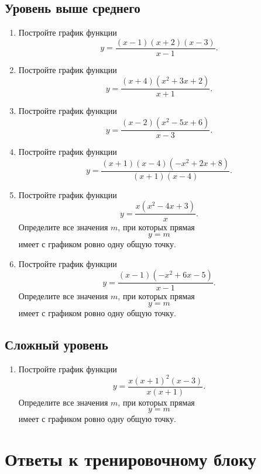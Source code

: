 \documentclass[a4paper,12pt]{article}
\begin{document}
\subsection*{Уровень выше среднего}

\begin{enumerate}[label=\textbf{\arabic*.},start=4]
  \item Постройте график функции
  \[
    y=
    \frac{(x-1)(x+2)(x-3)}{x-1}.
  \]

  \item Постройте график функции
  \[
    y=
    \frac{(x+4)(x^2+3x+2)}{x+1}.
  \]

  \item Постройте график функции
  \[
    y=
    \frac{(x-2)(x^2-5x+6)}{x-3}.
  \]

  \item Постройте график функции
  \[
    y=
    \frac{(x+1)(x-4)(-x^2+2x+8)}
         {(x+1)(x-4)}.
  \]

  \item Постройте график функции
  \[
    y=
    \frac{x(x^2-4x+3)}{x}.
  \]
  Определите все значения \(m\), при которых прямая
  \[
    y=m
  \]
  имеет с графиком ровно одну общую точку.

  \item Постройте график функции
  \[
    y=
    \frac{(x-1)(-x^2+6x-5)}{x-1}.
  \]
  Определите все значения \(m\), при которых прямая
  \[
    y=m
  \]
  имеет с графиком ровно одну общую точку.
\end{enumerate}

\subsection*{Сложный уровень}

\begin{enumerate}[label=\textbf{\arabic*.},start=10]
  \item Постройте график функции
  \[
    y=
    \frac{x(x+1)^2(x-3)}
         {x(x+1)}.
  \]
  Определите все значения \(m\), при которых прямая
  \[
    y=m
  \]
  имеет с графиком ровно одну общую точку.
\end{enumerate}


\clearpage
\section*{Ответы к тренировочному блоку}
\end{document}
